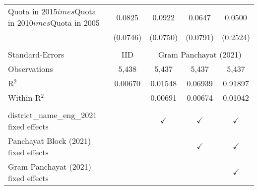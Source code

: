 \begin{tabular}{lcccc}
   Quota in 2015$	imes$Quota in 2010$	imes$Quota in 2005 & 0.0825         & 0.0922         & 0.0647         & 0.0500\\   
                                                           & (0.0746)       & (0.0750)       & (0.0791)       & (0.2524)\\   
    \\
   Standard-Errors & IID & \multicolumn{3}{c}{Gram Panchayat (2021)} \\ 
   Observations                                            & 5,438          & 5,437          & 5,437          & 5,437\\  
   R$^2$                                                   & 0.00670        & 0.01548        & 0.06939        & 0.91897\\  
   Within R$^2$                                            &                & 0.00691        & 0.00674        & 0.01042\\  
    \\
   district\_name\_eng\_2021 fixed effects                 &                & $\checkmark$   & $\checkmark$   & $\checkmark$\\   
   Panchayat Block (2021) fixed effects                    &                &                & $\checkmark$   & $\checkmark$\\   
   Gram Panchayat (2021) fixed effects                     &                &                &                & $\checkmark$\\   
   \bottomrule
\end{tabular}
\par\endgroup


